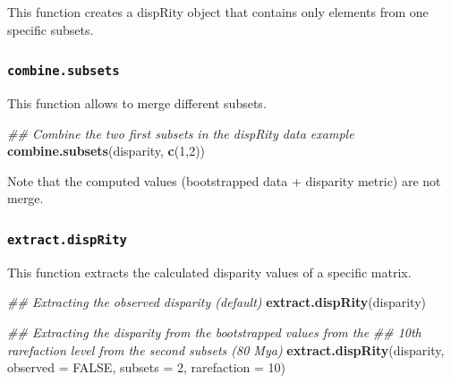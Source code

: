 \documentclass[]{book}
\newenvironment{Shaded}{\begin{snugshade}}{\end{snugshade}}
\newcommand{\CommentTok}[1]{\textcolor[rgb]{0.56,0.35,0.01}{\textit{#1}}}
\newcommand{\DataTypeTok}[1]{\textcolor[rgb]{0.13,0.29,0.53}{#1}}
\newcommand{\DecValTok}[1]{\textcolor[rgb]{0.00,0.00,0.81}{#1}}
\newcommand{\KeywordTok}[1]{\textcolor[rgb]{0.13,0.29,0.53}{\textbf{#1}}}
\newcommand{\NormalTok}[1]{#1}
\newcommand{\OperatorTok}[1]{\textcolor[rgb]{0.81,0.36,0.00}{\textbf{#1}}}
\newcommand{\OtherTok}[1]{\textcolor[rgb]{0.56,0.35,0.01}{#1}}
\newcommand{\StringTok}[1]{\textcolor[rgb]{0.31,0.60,0.02}{#1}}
\begin{document}
This function creates a dispRity object that contains only elements from one specific subsets.

\begin{Shaded}
\end{Shaded}

\hypertarget{combine.subsets}{%
\subsubsection{\texorpdfstring{\texttt{combine.subsets}}{combine.subsets}}\label{combine.subsets}}

This function allows to merge different subsets.

\begin{Shaded}
\begin{Highlighting}[]
\CommentTok{## Combine the two first subsets in the dispRity data example}
\KeywordTok{combine.subsets}\NormalTok{(disparity, }\KeywordTok{c}\NormalTok{(}\DecValTok{1}\NormalTok{,}\DecValTok{2}\NormalTok{))}
\end{Highlighting}
\end{Shaded}

Note that the computed values (bootstrapped data + disparity metric) are not merge.

\hypertarget{extract.disprity}{%
\subsubsection{\texorpdfstring{\texttt{extract.dispRity}}{extract.dispRity}}\label{extract.disprity}}

This function extracts the calculated disparity values of a specific matrix.

\begin{Shaded}
\begin{Highlighting}[]
\CommentTok{## Extracting the observed disparity (default)}
\KeywordTok{extract.dispRity}\NormalTok{(disparity)}

\CommentTok{## Extracting the disparity from the bootstrapped values from the}
\CommentTok{## 10th rarefaction level from the second subsets (80 Mya)}
\KeywordTok{extract.dispRity}\NormalTok{(disparity, }\DataTypeTok{observed =} \OtherTok{FALSE}\NormalTok{, }\DataTypeTok{subsets =} \DecValTok{2}\NormalTok{, }\DataTypeTok{rarefaction =} \DecValTok{10}\NormalTok{)}
\end{Highlighting}
\end{Shaded}
\end{document}
